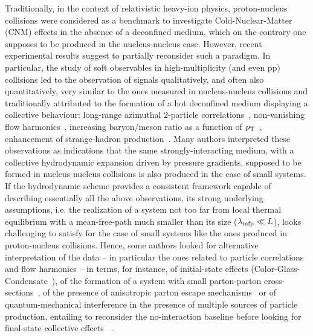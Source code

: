 Traditionally, in the context of relativistic heavy-ion physics, proton-nucleus collisions were considered as a benchmark to investigate Cold-Nuclear-Matter (CNM) effects in the absence of a deconfined medium, which on the contrary one supposes to be produced in the nucleus-nucleus case. However, recent experimental results suggest to partially reconsider such a paradigm. 
In particular, the study of soft observables in high-multiplicity \pPb (and even pp) collisions led to the observation of signals qualitatively, and often also quantitatively, very similar to the ones measured in nucleus-nucleus collisions and traditionally attributed to the formation of a hot deconfined medium displaying a collective behaviour: long-range azimuthal 2-particle correlations~\cite{Khachatryan:2010gv,CMS:2012qk,Abelev:2012ola,Aad:2012gla}, non-vanishing flow harmonics~\cite{ABELEV:2013wsa,Khachatryan:2015waa}, increasing baryon/meson ratio as a function of $p\sb{\scriptstyle\mathrm{T}}$~\cite{Abelev:2013haa}, enhancement of strange-hadron production~\cite{Adam:2015vsf}. Many authors interpreted these observations as indications that the same strongly-interacting medium, with a collective hydrodynamic expansion driven by pressure gradients, supposed to be formed in nucleus-nucleus collisions is also produced in the case of small systems. If the hydrodynamic scheme provides a consistent framework capable of describing essentially all the above observations, its strong underlying assumptions, i.e. the realization of a system not too far from local thermal equilibrium with a mean-free-path much smaller than its size ($\lambda_{\rm mfp}\ll L$), looks challenging to satisfy for the case of small systems like the ones produced in proton-nucleus collisions. Hence, some authors looked for alternative interpretation of the data -- in particular the ones related to particle correlations and flow harmonics -- in terms, for instance, of initial-state effects (Color-Glass-Condensate~\cite{Dusling:2013qoz}), of the formation of a system with small parton-parton cross-sections~\cite{Bzdak:2014dia}, of the presence of anisotropic parton escape mechanisms~\cite{HE2016506} or of quantum-mechanical interference in the presence of multiple sources of particle production, entailing to reconsider the no-interaction baseline before looking for final-state collective effects~\cite{Blok:2017pui} .

